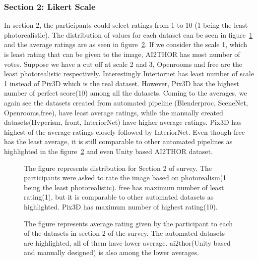 \subsubsection{Section 2: Likert Scale}
In section 2, the participants could select ratings from 1 to 10 (1 being the least photorealistic).
The distribution of values for each dataset can be seen in figure~\ref{fig:question2} and the average ratings are as seen in figure~\ref{fig:question2_2}.
If we consider the scale 1, which is least rating that can be given to the image, AI2THOR has most number of votes.
Suppose we have a cut off at scale 2 and 3, Openrooms and \gls{free} are the least photorealistic respectively.
Interestingly Interiornet has least number of scale 1 instead of Pix3D which is the real dataset.
However, Pix3D has the highest number of perfect score(10) among all the datasets.
Coming to the averages, we again see the datasets created from automated pipeline (Blenderproc, SceneNet, Openrooms,\gls{free}), have least average ratings,
while the manually created datasets(Hyperism, \gls{front}, InteriorNet) have higher average ratings.
Pix3D has highest of the average ratings closely followed by InteriorNet.
Even though \gls{free} has the least average, it is still comparable to other automated pipelines as highlighted in the figure~\ref{fig:question2_2} and even Unity based AI2THOR dataset.

\begin{figure}
    \centering
    \resizebox{\textwidth}{!}{}
    \caption{The figure represents distribution for Section 2 of survey. The participants were asked to rate the image based on photorealism(1 being the least photorealistic).
    \gls{free} has maximum number of least rating(1), but it is comparable to other automated datasets as highlighted. Pix3D has maximum number of highest rating(10).}
    \label{fig:question2}
\end{figure}

\begin{figure}
    \centering
    \resizebox{\textwidth}{10cm}{}
    \caption{The figure represents average rating given by the participant to each of the datasets in section 2 of the survey.
    The automated datasets are highlighted, all of them have lower average. \gls{ai2thor}(Unity based and manually designed) is also among the lower averages.}
    \label{fig:question2_2}
\end{figure}

